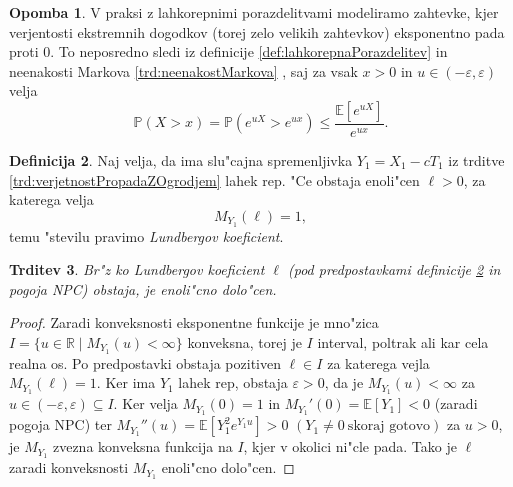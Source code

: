 \documentclass[12pt, a4paper, reqno]{amsart}
\theoremstyle{definition}
\newtheorem{definicija}{Definicija}[section]
\newtheorem{opomba}[definicija]{Opomba}
\theoremstyle{plain}
\newtheorem{trditev}[definicija]{Trditev}
\newcommand{\R}{\mathbb{R}}
\newcommand{\E}{\mathbb{E}}
\newcommand{\Prob}{\mathbb{P}}
\newcommand{\1}{\mathds{1}}
\newcommand*{\refPriloga}[1]{%
  \begingroup
    \hypersetup{
      linkcolor=red,
      linkbordercolor=red,
    }%
    \ref{#1}%
  \endgroup
}
\begin{document}
            \begin{opomba}
                V praksi z lahkorepnimi porazdelitvami modeliramo zahtevke, kjer verjentosti ekstremnih 
                dogodkov (torej zelo velikih zahtevkov) eksponentno pada proti $0$. To neposredno sledi iz 
                definicije \ref{def:lahkorepnaPorazdelitev} in neenakosti Markova \refPriloga{trd:neenakostMarkova}, 
                saj za vsak 
                $x>0$ in $u\in(-\varepsilon, \varepsilon)$ velja
                \begin{equation*}
                    \Prob\left(X > x\right) = \Prob\left(e^{uX} > e^{ux}\right) \leq \frac{\E\left[e^{uX}\right]}{e^{ux}}.
                \end{equation*}
                \label{op:lahkorepnaPorazdelitev}
            \end{opomba}

            \begin{definicija}
                Naj velja, da ima slu"cajna spremenljivka $Y_1 = X_1 - cT_1$ iz trditve \ref{trd:verjetnostPropadaZOgrodjem} 
                lahek rep. "Ce obstaja enoli"cen $\ell > 0$, za katerega velja
                \begin{equation*}
                    M_{Y_1}(\ell)  = 1,
                \end{equation*}
                temu "stevilu pravimo \textit{Lundbergov koeficient}.
                \label{def:LundbergovKoeficient}
            \end{definicija}

            \begin{trditev}
                Br"z ko Lundbergov koeficient $\ell$ (pod predpostavkami definicije \ref{def:LundbergovKoeficient} in 
                pogoja NPC)
                obstaja, je enoli"cno dolo"cen.
                \label{trd:enolicnostLundbergovegaKoeficienta}
            \end{trditev}

            \begin{proof}
                Zaradi konveksnosti eksponentne funkcije je mno"zica $I = \{u\in\R \mid M_{Y_1}(u) < \infty\}$ konveksna, 
                torej je $I$ interval, poltrak ali kar cela realna os. Po predpostavki obstaja pozitiven $\ell \in I$ za 
                katerega vejla $M_{Y_1}(\ell) = 1$.
                Ker ima $Y_1$ lahek rep, obstaja $\varepsilon > 0$, da je $M_{Y_1}(u) < \infty$ za $u\in(-\varepsilon, \varepsilon)\subseteq I$.
                Ker velja $M_{Y_1}(0) = 1$ in $M_{Y_1}'(0) = \E\left[Y_1\right] < 0$ (zaradi pogoja NPC) ter
                $M_{Y_1}''(u) = \E\left[Y_1^2e^{Y_1u}\right] > 0$ $(Y_1 \neq 0 \ \text{skoraj gotovo})$ za 
                $u>0$, je $M_{Y_1}$ zvezna konveksna funkcija na $I$, kjer 
                v okolici ni"cle pada. Tako je $\ell$ zaradi konveksnosti $M_{Y_1}$ enoli"cno dolo"cen.
            \end{proof}
\end{document}
